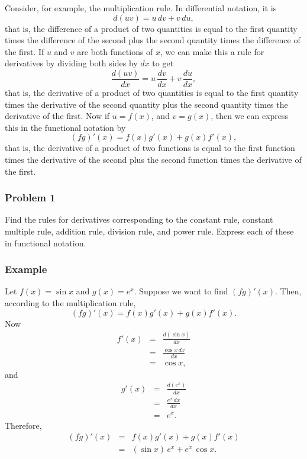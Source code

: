 \documentclass[polutonikogreek,english,twoside,openright]{article}
\begin{document}
Consider, for example, the multiplication rule.  In differential notation, it is
$$d(uv) = u\,dv + v\,du,$$
that is, the difference of a product of two quantities is equal to the
first quantity times the difference of the second plus the second
quantity times the difference of the first.  If $u$ and $v$ are both
functions of $x$, we can make this a rule for derivatives by dividing
both sides by $dx$ to get
$$\frac{d(uv)}{dx} = u\,\frac{dv}{dx} + v\,\frac{du}{dx},$$
that is, the derivative of a product of two quantities is equal to the
first quantity times the derivative of the second quantity plus the
second quantity times the derivative of the first.  Now if $u=f(x)$,
and $v=g(x)$, then we can express this in the functional notation by
$$(fg)'(x) = f(x)g'(x) +g(x)f'(x),$$
that is, the derivative of a product of two functions is equal to the
first function times the derivative of the second plus the second
function times the derivative of the first.

\subsubsection*{Problem 1} Find the rules for derivatives
corresponding to the constant rule, constant multiple rule, addition
rule, division rule, and power rule.  Express each of these in
functional notation.

\subsubsection*{Example} Let $f(x) = \sin x$ and $g(x) = e^x$.
Suppose we want to find $(fg)'(x).$ Then, according to the
multiplication rule,
$$(fg)'(x)=  f(x)g'(x) + g(x)f'(x).$$
Now
\setlength{\jot}{1.5ex}
\begin{eqnarray*}
  f'(x) & = & \frac{d(\sin x)}{dx}\\
        & = & \frac{\cos x\,dx}{dx}\\
        & = & \cos x,
\end{eqnarray*}
and 
\begin{eqnarray*}
  g'(x) & = & \frac{d(e^x)}{dx}\\
        & = & \frac{e^x\,dx}{dx}\\
        & = & e^x.
\end{eqnarray*}
Therefore,
\begin{eqnarray*}
  (fg)'(x) & = & f(x)g'(x) + g(x)f'(x)\\
           & = & (\sin x)\, e^x + e^x \,\cos x.
\end{eqnarray*}
\end{document}
